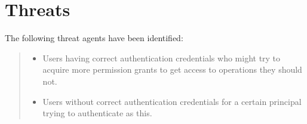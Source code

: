 \documentclass[10pt,a4paper,english]{book}
\begin{document}

\hypertarget{threats}{}
\section{Threats}

The following threat agents have been identified:
\begin{quote}
\begin{itemize}
\item {} 
Users having correct authentication credentials who might try to
acquire more permission grants to get access to operations they
should not.

\item {} 
Users without correct authentication credentials for a certain
principal trying to authenticate as this.

\end{itemize}
\end{quote}
\end{document}
